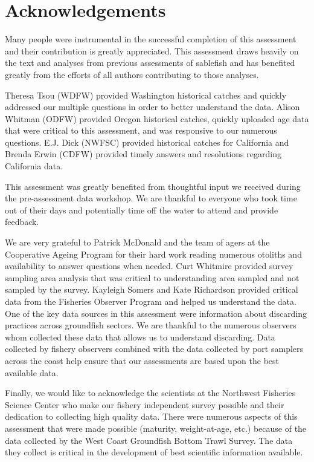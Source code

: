 \documentclass[
  english,
]{article}
\begin{document}
\newpage{}

\section{Acknowledgements}\label{sec-acknowledgements}

Many people were instrumental in the successful completion of this
assessment and their contribution is greatly appreciated. This
assessment draws heavily on the text and analyses from previous
assessments of sablefish and has benefited greatly from the efforts of
all authors contributing to those analyses.

Theresa Tsou (WDFW) provided Washington historical catches and quickly
addressed our multiple questions in order to better understand the data.
Alison Whitman (ODFW) provided Oregon historical catches, quickly
uploaded age data that were critical to this assessment, and was
responsive to our numerous questions. E.J. Dick (NWFSC) provided
historical catches for California and Brenda Erwin (CDFW) provided
timely answers and resolutions regarding California data.

This assessment was greatly benefited from thoughtful input we received
during the pre-assessment data workshop. We are thankful to everyone who
took time out of their days and potentially time off the water to attend
and provide feedback.

We are very grateful to Patrick McDonald and the team of agers at the
Cooperative Ageing Program for their hard work reading numerous otoliths
and availability to answer questions when needed. Curt Whitmire provided
survey sampling area analysis that was critical to understanding area
sampled and not sampled by the survey. Kayleigh Somers and Kate
Richardson provided critical data from the Fisheries Observer Program
and helped us understand the data. One of the key data sources in this
assessment were information about discarding practices across groundfish
sectors. We are thankful to the numerous observers whom collected these
data that allows us to understand discarding. Data collected by fishery
observers combined with the data collected by port samplers across the
coast help ensure that our assessments are based upon the best available
data.

Finally, we would like to acknowledge the scientists at the Northwest
Fisheries Science Center who make our fishery independent survey
possible and their dedication to collecting high quality data. There
were numerous aspects of this assessment that were made possible
(maturity, weight-at-age, etc.) because of the data collected by the
West Coast Groundfish Bottom Trawl Survey. The data they collect is
critical in the development of best scientific information available.
\end{document}
